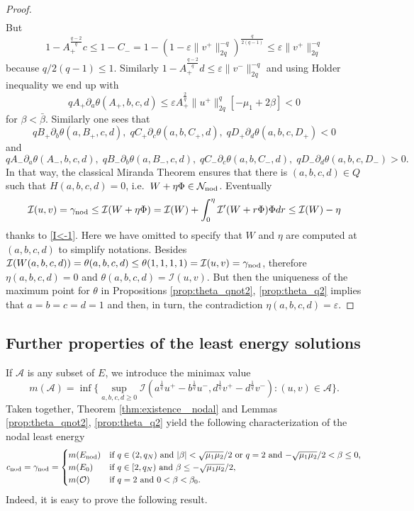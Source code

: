 \documentclass[reqno]{amsart}
\begin{document}
\begin{proof}
\begin{align*}
\end{align*}
But
\[
1-A_+^{\frac{q-2}q}c \le  1- C_-
= 1- \left(1-\varepsilon\|v^+\|_{2q}^{-q}\right)^{\frac{q}{2(q-1)}} \le\varepsilon\|v^+\|_{2q}^{-q}
\]
because $q/2(q-1)\le 1$. Similarly $1-A_+^{\frac{q-2}q}d \le \varepsilon\|v^-\|_{2q}^{-q} $
and using Holder inequality we end up with
\[
 q A_+ \partial_a\theta(A_+,b,c,d)
 \le \varepsilon A_+^{\frac{2}q}\|u^+\|_{2q}^{q} \left[ -\mu_1 +2\beta \right] <0
\]
for $\beta <\bar \beta$. Similarly one sees that
 \[
q B_+ \partial_b\theta(a,B_+,c,d), \; q C_+ \partial_c\theta(a,b, C_+,d),
\; q D_+ \partial_d\theta(a,b,c,D_+)< 0
\]
and
\[   q A_- \partial_a\theta(A_-,b,c,d) ,
 \; q B_-\partial_b\theta(a,B_-,c,d),
  \; q C_- \partial_c\theta(a,b, C_-,d),
  \; q D_- \partial_d\theta(a,b,c,D_-) >0 .
\]
In that way, the classical Miranda Theorem \cite{Miranda} ensures that there is
$(a,b,c,d)\in Q$ such that $H(a,b,c,d) =0$, i.e.\
$W+\eta\Phi\in \mathcal N_{\rm nod}$. Eventually
\[
  \mathcal I(u,v) = \gamma_{\rm nod} \le \mathcal I(W+\eta\Phi)
  = \mathcal I(W)+ \int_0^{\eta}  \mathcal I'(W+r\Phi) \Phi dr \le \mathcal I(W) - \eta
\]
thanks to \eqref{I<-1}.
Here we have omitted to specify that $W$ and $\eta$ are computed at $(a,b,c,d)$
to simplify notations.
 Besides $\mathcal I(W(a,b,c,d)) =\theta(a,b,c,d) \le \theta(1,1,1,1)
 = \mathcal I(u,v)=\gamma_{\rm nod}$, therefore
$\eta(a,b,c,d)=0$ and $\theta(a,b,c,d) =\mathcal I(u,v)$.
 But then the uniqueness of the maximum point for $\theta$ in
Propositions \ref{prop:theta_qnot2}, \ref{prop:theta_q2} implies that $a=b=c=d=1$
and then, in turn, the contradiction $\eta(a,b,c,d)=\varepsilon$.
\end{proof}

\subsection{Further properties of the least energy solutions}\label{sub:properties_lesc}

If $\mathcal A$ is any subset of $E$, we introduce the minimax value
\[
m(\mathcal A)=  \inf\big\{ \sup_{a,b,c,d\ge 0} \mathcal I (a^{\frac{1}q}u^+
-b^{\frac{1}q}u^-, d^{\frac{1}q}v^+-d^{\frac{1}q}v^-) : (u,v)\in \mathcal A\big\} .
 \]
Taken together, Theorem \ref{thm:existence_ nodal} and Lemmas
\ref{prop:theta_qnot2}, \ref{prop:theta_q2} yield the following  characterization of
the nodal least energy
\[
 c_{\rm nod}=\gamma_{\rm nod}= \begin{cases}
 m({E_{\rm nod}})& \text{if $q\in (2, q_N)$ and  $|\beta|<\sqrt{\mu_1\mu_2}/2 $
  or $q=2$ and $-\sqrt{\mu_1\mu_2}/2 <\beta\le 0$,} \\
 m({E_0}) & \text{if $q\in [2, q_N)$ and $ \beta \le - \sqrt{\mu_1\mu_2}/2$,}  \\
 m({\mathcal O}) & \text{if $q=2$ and  $0<\beta <\beta_0$.}
\end{cases}
\]
Indeed, it is easy to prove the following result.
\end{document}
